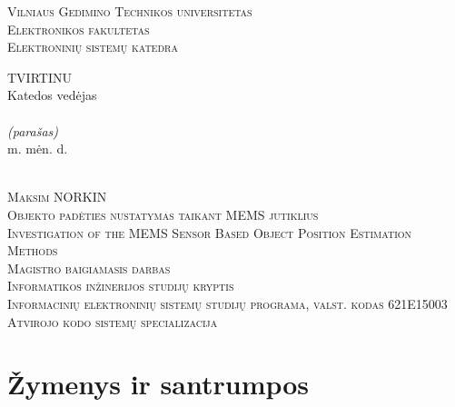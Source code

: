 \documentclass[]{vgtuef}
\begin{document}
  \begin{titlepage}
    \setcounter{page}{7}
    \thispagestyle{plain}
    \begin{center}
      \textsc{\Large Vilniaus Gedimino Technikos universitetas}\\
      \textsc{\Large Elektronikos fakultetas}\\
      \textsc{\Large Elektroninių sistemų katedra}\\[10mm]
      \hfill
      \begin{minipage}{.35\linewidth}
        \begin{flushleft}
          \uppercase{Tvirtinu}\\
          Katedos vedėjas\\[5mm]
          \makebox[1.8in]{\hrulefill}\\
          \scriptsize{\textit{(parašas)}}\\
          \normalsize{\the\year m. \makebox[0.45in]{\hrulefill} mėn. \makebox[0.15in]{\hrulefill} d.}\\
        \end{flushleft}
      \end{minipage}\\[10mm]
      \textsc{\Large Maksim NORKIN}\\[1mm]
      \textsc{\Large Objekto padėties nustatymas taikant MEMS jutiklius}\\[15mm]
      \textsc{\Large Investigation of the MEMS Sensor Based Object Position Estimation Methods}\\[10mm]
      \textsc{\large Magistro baigiamasis darbas}\\[10mm]
      \textsc{Informatikos inžinerijos studijų kryptis}\\
      \textsc{Informacinių elektroninių sistemų studijų programa, valst. kodas 621E15003}\\
      \textsc{Atvirojo kodo sistemų specializacija}\\
    \end{center}
  \end{titlepage}

  \setcounter{page}{8}

  
  
  \newpage

  \tableofcontents

  \newpage

  \section*{Žymenys ir santrumpos}
\end{document}

